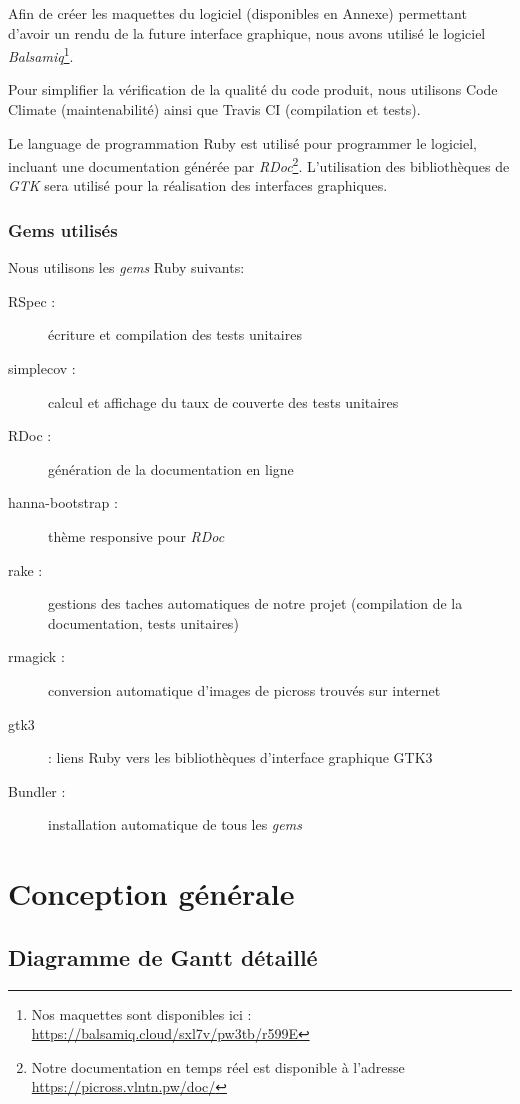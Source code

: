 \documentclass{report}
\makeatletter
\newcommand\footnoteref[1]{\protected@xdef\@thefnmark{\ref{#1}}\@footnotemark}
\makeatother
\begin{document}
	Afin de créer les maquettes du logiciel (disponibles en Annexe) permettant d’avoir un rendu de la future interface graphique, nous avons utilisé le logiciel \textit{Balsamiq}\footnote{Nos maquettes sont disponibles ici : \url{https://balsamiq.cloud/sxl7v/pw3tb/r599E}}.

	Pour simplifier la vérification de la qualité du code produit, nous utilisons Code Climate (maintenabilité) ainsi que Travis CI (compilation et tests).

	Le language de programmation Ruby est utilisé pour programmer le logiciel, incluant une documentation générée par \textit{RDoc}\footnote{\label{rdoc}Notre documentation en temps réel est disponible à l'adresse \url{https://picross.vlntn.pw/doc/}}. L’utilisation des bibliothèques de \textit{GTK} sera utilisé pour la réalisation des interfaces graphiques.
	
	\subsection{Gems utilisés}
	Nous utilisons les \textit{gems} Ruby suivants:
	\begin{description}
	\item[RSpec :] écriture et compilation des tests unitaires
	\item[simplecov :] calcul et affichage du taux de couverte des tests unitaires
	\item[RDoc :] génération de la documentation en ligne \footnoteref{rdoc}
	\item[hanna-bootstrap :] thème responsive pour \textit{RDoc}
	\item[rake :] gestions des taches automatiques de notre projet (compilation de la documentation, tests unitaires)
	\item[rmagick :] conversion automatique d'images de picross trouvés sur internet
	\item[gtk3] : liens Ruby vers les bibliothèques d'interface graphique GTK3
	\item[Bundler :] installation automatique de tous les \textit{gems}
	\end{description}

		
\chapter{Conception générale}

    \section{Diagramme de Gantt détaillé}
    
\end{document}
